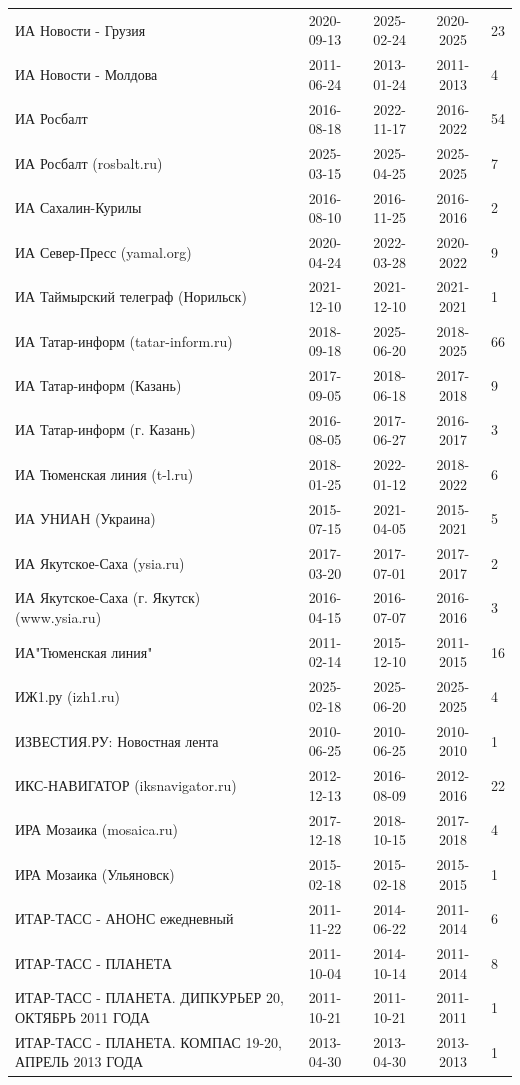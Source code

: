 \begin{longtable}{p{6cm}cccp{2cm}}
ИА Новости - Грузия & 2020-09-13 & 2025-02-24 & 2020-2025 & 23\\
ИА Новости - Молдова & 2011-06-24 & 2013-01-24 & 2011-2013 & 4\\
ИА Росбалт & 2016-08-18 & 2022-11-17 & 2016-2022 & 54\\
ИА Росбалт (rosbalt.ru) & 2025-03-15 & 2025-04-25 & 2025-2025 & 7\\
ИА Сахалин-Курилы & 2016-08-10 & 2016-11-25 & 2016-2016 & 2\\
ИА Север-Пресс (yamal.org) & 2020-04-24 & 2022-03-28 & 2020-2022 & 9\\
ИА Таймырский телеграф (Норильск) & 2021-12-10 & 2021-12-10 & 2021-2021 & 1\\
ИА Татар-информ (tatar-inform.ru) & 2018-09-18 & 2025-06-20 & 2018-2025 & 66\\
ИА Татар-информ (Казань) & 2017-09-05 & 2018-06-18 & 2017-2018 & 9\\
ИА Татар-информ (г. Казань) & 2016-08-05 & 2017-06-27 & 2016-2017 & 3\\
ИА Тюменская линия (t-l.ru) & 2018-01-25 & 2022-01-12 & 2018-2022 & 6\\
ИА УНИАН (Украина) & 2015-07-15 & 2021-04-05 & 2015-2021 & 5\\
ИА Якутское-Саха (ysia.ru) & 2017-03-20 & 2017-07-01 & 2017-2017 & 2\\
ИА Якутское-Саха (г. Якутск) (www.ysia.ru) & 2016-04-15 & 2016-07-07 & 2016-2016 & 3\\
ИА"Тюменская линия" & 2011-02-14 & 2015-12-10 & 2011-2015 & 16\\
ИЖ1.ру (izh1.ru) & 2025-02-18 & 2025-06-20 & 2025-2025 & 4\\
ИЗВЕСТИЯ.РУ: Новостная лента & 2010-06-25 & 2010-06-25 & 2010-2010 & 1\\
ИКС-НАВИГАТОР (iksnavigator.ru) & 2012-12-13 & 2016-08-09 & 2012-2016 & 22\\
ИРА Мозаика (mosaica.ru) & 2017-12-18 & 2018-10-15 & 2017-2018 & 4\\
ИРА Мозаика (Ульяновск) & 2015-02-18 & 2015-02-18 & 2015-2015 & 1\\
ИТАР-ТАСС - АНОНС ежедневный & 2011-11-22 & 2014-06-22 & 2011-2014 & 6\\
ИТАР-ТАСС - ПЛАНЕТА & 2011-10-04 & 2014-10-14 & 2011-2014 & 8\\
ИТАР-ТАСС - ПЛАНЕТА. ДИПКУРЬЕР 20, ОКТЯБРЬ 2011 ГОДА & 2011-10-21 & 2011-10-21 & 2011-2011 & 1\\
ИТАР-ТАСС - ПЛАНЕТА. КОМПАС 19-20, АПРЕЛЬ 2013 ГОДА & 2013-04-30 & 2013-04-30 & 2013-2013 & 1\\

\end{longtable}
